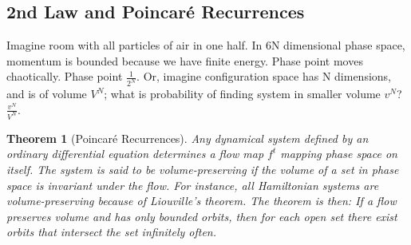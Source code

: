 \documentclass[]{article}
\newtheorem{thm}{Theorem}
\begin{document}
\subsection{2nd Law and Poincar\'e Recurrences}

Imagine room with all particles of air in one half. In 6N dimensional phase space, momentum is bounded because we have finite energy. Phase point moves chaotically. Phase point $\frac{1}{2^N}$. Or, imagine configuration space has N dimensions, and is of volume $V^N$; what is probability of finding system in smaller volume $v^N$? $\frac{v^N}{V^N}$. 

\begin{thm}[Poincar\'e Recurrences]
	Any dynamical system defined by an ordinary differential equation determines a flow map $f^t$ mapping phase space on itself. The system is said to be volume-preserving if the volume of a set in phase space is invariant under the flow. For instance, all Hamiltonian systems are volume-preserving because of Liouville's theorem. The theorem is then: If a flow preserves volume and has only bounded orbits, then for each open set there exist orbits that intersect the set infinitely often.
\end{thm}
\end{document}

